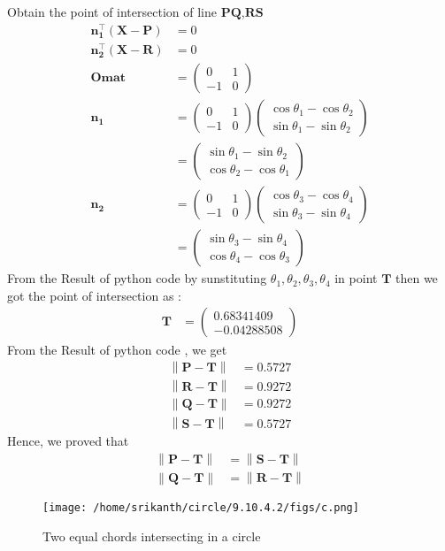 \documentclass[jornel,10pt,twocolumn]{article}
\providecommand{\norm}[1]{\left\lVert#1\right\rVert}
\newcommand{\myvec}[1]{\ensuremath{\begin{pmatrix}#1\end{pmatrix}}}
\let\vec\mathbf
\begin{document}
Obtain the point of intersection of line $\vec{PQ}$,$\vec{RS}$
\begin{align}
\vec{n_1^{\top}}(\vec{X}-\vec{P})&=0\label{15}\\
\vec{n_2^{\top}}(\vec{X}-\vec{R})&=0\label{16}\\
\vec{Omat}&=\myvec{0&1\\-1&0}\\
\vec{n_1}&=\myvec{0&1\\-1&0}\myvec{\cos{\theta_1}-\cos{\theta_2}\\\sin{\theta_1}-\sin{\theta_2}}\\
&=\myvec{\sin{\theta_1}-\sin{\theta_2}\\\cos{\theta_2}-\cos{\theta_1}}\\
\vec{n_2}&=\myvec{0&1\\-1&0}\myvec{\cos{\theta_3}-\cos{\theta_4}\\\sin{\theta_3}-\sin{\theta_4}}\\
&=\myvec{\sin{\theta_3}-\sin{\theta_4}\\\cos{\theta_4}-\cos{\theta_3}}
\end{align}
From the Result of python code by sunstituting $\theta_1,\theta_2,\theta_3,\theta_4$ in point $\vec{T}$ then we got the point of intersection as :
\begin{align}
\vec{T}&=\myvec{0.68341409\\-0.04288508}
\end{align}
From the Result of python code , we get
\begin{align}
\norm{\vec{P}-\vec{T}}&=0.5727\\
\norm{\vec{R}-\vec{T}}&=0.9272\\
\norm{\vec{Q}-\vec{T}}&=0.9272\\
\norm{\vec{S}-\vec{T}}&=0.5727
\end{align}
Hence, we proved that
\begin{align}
\norm{\vec{P}-\vec{T}}&=\norm{\vec{S}-\vec{T}}\\
\norm{\vec{Q}-\vec{T}}&=\norm{\vec{R}-\vec{T}}
\end{align} 
\begin{figure}[!h]
	\begin{center} 
	  \texttt{[image: /home/srikanth/circle/9.10.4.2/figs/c.png]}
	\end{center}
\caption{Two equal chords intersecting in a circle}
\label{fig:Fig1}
\end{figure}
\end{document}
